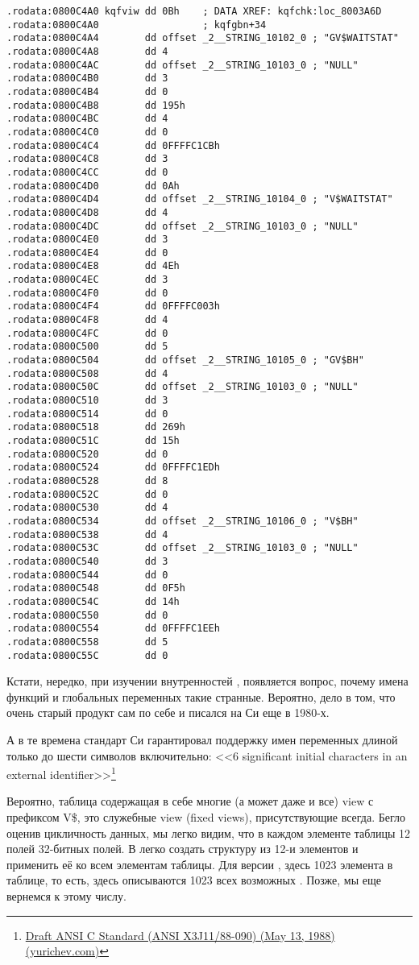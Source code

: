 \begin{lstlisting}[caption=kqf.o]
.rodata:0800C4A0 kqfviw dd 0Bh    ; DATA XREF: kqfchk:loc_8003A6D
.rodata:0800C4A0                  ; kqfgbn+34
.rodata:0800C4A4        dd offset _2__STRING_10102_0 ; "GV$WAITSTAT"
.rodata:0800C4A8        dd 4
.rodata:0800C4AC        dd offset _2__STRING_10103_0 ; "NULL"
.rodata:0800C4B0        dd 3
.rodata:0800C4B4        dd 0
.rodata:0800C4B8        dd 195h
.rodata:0800C4BC        dd 4
.rodata:0800C4C0        dd 0
.rodata:0800C4C4        dd 0FFFFC1CBh
.rodata:0800C4C8        dd 3
.rodata:0800C4CC        dd 0
.rodata:0800C4D0        dd 0Ah
.rodata:0800C4D4        dd offset _2__STRING_10104_0 ; "V$WAITSTAT"
.rodata:0800C4D8        dd 4
.rodata:0800C4DC        dd offset _2__STRING_10103_0 ; "NULL"
.rodata:0800C4E0        dd 3
.rodata:0800C4E4        dd 0
.rodata:0800C4E8        dd 4Eh
.rodata:0800C4EC        dd 3
.rodata:0800C4F0        dd 0
.rodata:0800C4F4        dd 0FFFFC003h
.rodata:0800C4F8        dd 4
.rodata:0800C4FC        dd 0
.rodata:0800C500        dd 5
.rodata:0800C504        dd offset _2__STRING_10105_0 ; "GV$BH"
.rodata:0800C508        dd 4
.rodata:0800C50C        dd offset _2__STRING_10103_0 ; "NULL"
.rodata:0800C510        dd 3
.rodata:0800C514        dd 0
.rodata:0800C518        dd 269h
.rodata:0800C51C        dd 15h
.rodata:0800C520        dd 0
.rodata:0800C524        dd 0FFFFC1EDh
.rodata:0800C528        dd 8
.rodata:0800C52C        dd 0
.rodata:0800C530        dd 4
.rodata:0800C534        dd offset _2__STRING_10106_0 ; "V$BH"
.rodata:0800C538        dd 4
.rodata:0800C53C        dd offset _2__STRING_10103_0 ; "NULL"
.rodata:0800C540        dd 3
.rodata:0800C544        dd 0
.rodata:0800C548        dd 0F5h
.rodata:0800C54C        dd 14h
.rodata:0800C550        dd 0
.rodata:0800C554        dd 0FFFFC1EEh
.rodata:0800C558        dd 5
.rodata:0800C55C        dd 0
\end{lstlisting}

Кстати, нередко, при изучении внутренностей \oracle, появляется вопрос, почему имена функций и глобальных переменных такие странные.
Вероятно, дело в том, что \oracle очень старый продукт сам по себе и писался на Си еще в 1980-х.

А в те времена стандарт Си гарантировал поддержку имен переменных длиной только до шести символов включительно:
<<6 significant initial characters in an external identifier>>\footnote{\href{http://go.yurichev.com/17142}{Draft ANSI C Standard (ANSI X3J11/88-090) (May 13, 1988) (yurichev.com)}}

Вероятно, таблица  содержащая в себе многие (а может даже и все) view с префиксом V\$, это служебные view (fixed views), присутствующие всегда.
Бегло оценив цикличность данных, мы легко видим, что в каждом элементе таблицы  12 полей 32-битных полей.
В \IDA легко создать структуру из 12-и элементов и применить её ко всем элементам таблицы.
Для версии , здесь 1023 элемента в таблице, то есть, здесь описываются 1023 всех возможных .
Позже, мы еще вернемся к этому числу.

